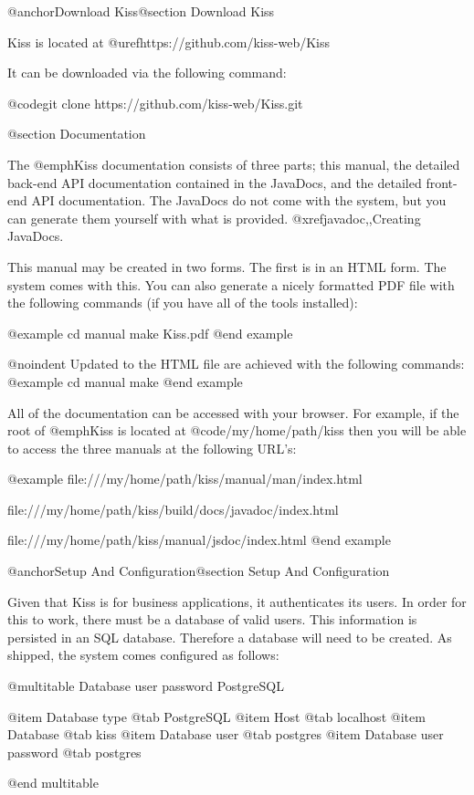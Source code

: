 @anchor{Download Kiss}@section Download Kiss


Kiss is located at @uref{https://github.com/kiss-web/Kiss}

It can be downloaded via the following command:

@code{git clone https://github.com/kiss-web/Kiss.git}

@section Documentation

The @emph{Kiss} documentation consists of three parts; this manual, the detailed back-end API documentation contained in the JavaDocs,
and the detailed front-end API documentation.
The JavaDocs do not come with the system, but you can generate them yourself with what is provided.  @xref{javadoc,,Creating JavaDocs}.

This manual may be created in two forms.  The first is in an HTML
form.  The system comes with this.  You can also generate a nicely
formatted PDF file with the following commands (if you have all of the tools installed):

@example
cd manual
make Kiss.pdf
@end example

@noindent
Updated to the HTML file are achieved with the following commands:
@example
cd manual
make
@end example

All of the documentation can be accessed with your browser.  For example,
if the root of @emph{Kiss} is located at @code{/my/home/path/kiss} then you will be able to access the three
manuals at the following URL's:

@example
file:///my/home/path/kiss/manual/man/index.html

file:///my/home/path/kiss/build/docs/javadoc/index.html

file:///my/home/path/kiss/manual/jsdoc/index.html
@end example

@anchor{Setup And Configuration}@section Setup And Configuration

Given that Kiss is for business applications, it authenticates its
users.  In order for this to work, there must be a database of valid
users.  This information is persisted in an SQL database.  Therefore a
database will need to be created.  As shipped, the system comes
configured as follows:

@multitable {Database user password} {PostgreSQL} 

@item Database type
@tab PostgreSQL
@item Host
@tab localhost
@item Database
@tab kiss
@item Database user
@tab postgres
@item Database user password
@tab postgres

@end multitable

